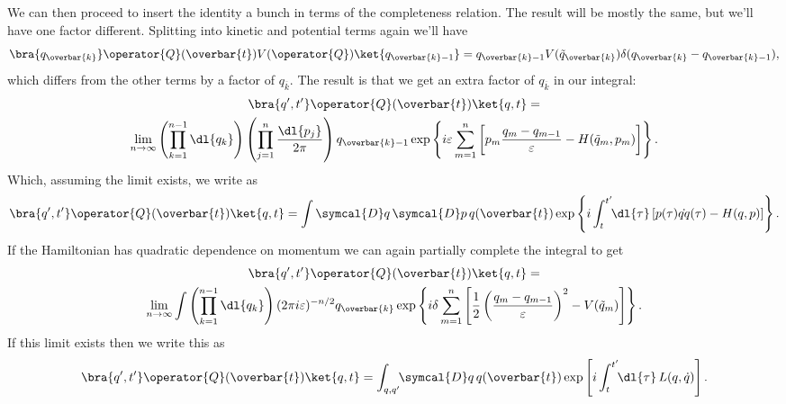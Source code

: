 \documentclass[fleqn]{NotesClass}
\newcommand{\lagrangian}{L}
\newcommand{\DL}[1]{\symcal{D}#1}
\newcommand{\DD}[1]{\,\symcal{D}#1}
\begin{document}
    We can then proceed to insert the identity a bunch in terms of the completeness relation.
    The result will be mostly the same, but we'll have one factor different.
    Splitting into kinetic and potential terms again we'll have
    \begin{equation}
        \bra{q_{\overbar{k}}} \operator{Q}(\overbar{t}) V(\operator{Q}) \ket{q_{\overbar{k}-1}} = q_{\overbar{k}-1} V(\tilde{q}_{\overbar{k}}) \delta(q_{\overbar{k}} - q_{\overbar{k} - 1}),
    \end{equation}
    which differs from the other terms by a factor of \(q_{\overbar{k}}\).
    The result is that we get an extra factor of \(q_{\overbar{k}}\) in our integral:
    \begin{gather}
        \bra{q',t'} \operator{Q}(\overbar{t})\ket{q,t} =\\
        \lim_{n\to\infty} \left( \prod_{k=1}^{n-1}\dl{q_k} \right) \left( \prod_{j=1}^{n} \frac{\dl{p_j}}{2\pi} \right) q_{\overbar{k}-1} \exp\left\{ i\varepsilon \sum_{m=1}^{n} \left[ p_m \frac{q_m - q_{m-1}}{\varepsilon} - H(\tilde{q}_m, p_m) \right] \right\}.\notag
    \end{gather}
    Which, assuming the limit exists, we write as
    \begin{equation}
        \bra{q',t'}\operator{Q}(\overbar{t})\ket{q,t} = \int \DL{q} \DD{p} \, q(\overbar{t}) \exp\left\{ i \int_t^{t'} \!\! \dl{\tau} \, [p(\tau) \dot{qq}(\tau) - H(q, p)] \right\}.
    \end{equation}
    If the Hamiltonian has quadratic dependence on momentum we can again partially complete the integral to get
    \begin{gather}
        \bra{q',t'} \operator{Q}(\overbar{t})\ket{q,t} =\\
        \lim_{n\to\infty} \int\left( \prod_{k=1}^{n-1} \dl{q_k} \right) (2\pi i\varepsilon)^{-n/2} q_{\overbar{k}} \exp\left\{ i\delta\sum_{m=1}^{n} \left[ \frac{1}{2}\left( \frac{q_m - q_{m-1}}{\varepsilon} \right)^2 - V(\tilde{q}_m) \right] \right\}. \notag
    \end{gather}
    If this limit exists then we write this as
    \begin{equation}
        \bra{q',t'} \operator{Q}(\overbar{t})\ket{q,t} = \int_{q,q'} \!\! \DL{q} \, q(\overbar{t}) \exp\left[ i \int_t^{t'} \!\! \dl{\tau} \, \lagrangian(q, \dot{q}) \right].
    \end{equation}
    
\end{document}
